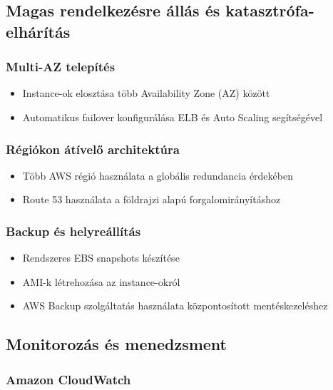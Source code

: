 \documentclass[a4paper,12pt]{article}
\begin{document}
    \subsection{Magas rendelkezésre állás és katasztrófa-elhárítás}

    \subsubsection{Multi-AZ telepítés}

    \begin{itemize}
        \item Instance-ok elosztása több Availability Zone (AZ) között
        \item Automatikus failover konfigurálása ELB és Auto Scaling segítségével
    \end{itemize}

    \subsubsection{Régiókon átívelő architektúra}

    \begin{itemize}
        \item Több AWS régió használata a globális redundancia érdekében
        \item Route 53 használata a földrajzi alapú forgalomirányításhoz
    \end{itemize}

    \subsubsection{Backup és helyreállítás}

    \begin{itemize}
        \item Rendszeres EBS snapshots készítése
        \item AMI-k létrehozása az instance-okról
        \item AWS Backup szolgáltatás használata központosított mentéskezeléshez
    \end{itemize}

    \subsection{Monitorozás és menedzsment}

    \subsubsection{Amazon CloudWatch}
\end{document}
